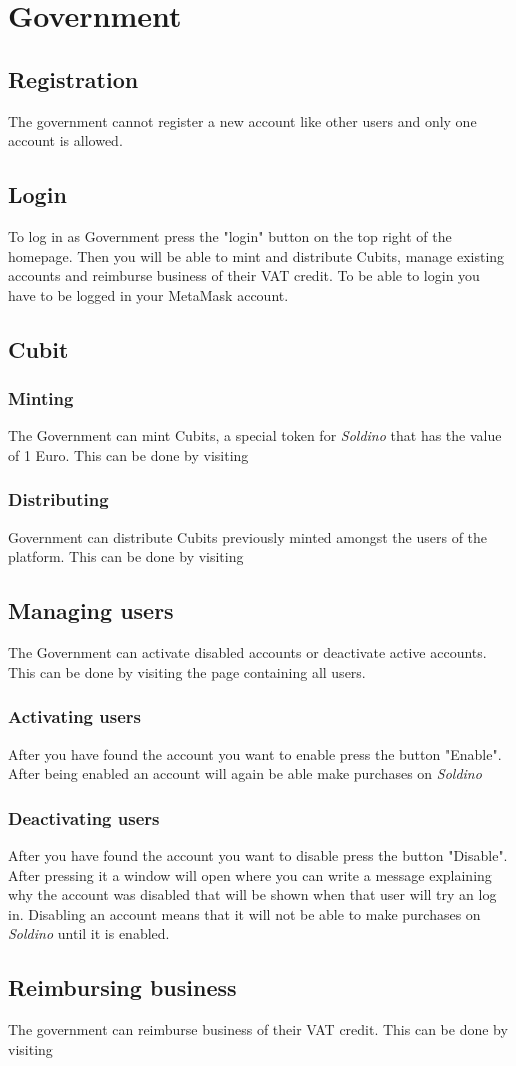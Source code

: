 \section{Government}
	\subsection{Registration}
	The government cannot register a new account like other users and only one 
	account is allowed. 
	\subsection{Login}
	To log in as Government press the "login" button on the top right of the 
	homepage. Then you will be able to mint and distribute Cubits, manage existing accounts and reimburse business of their VAT credit. To be able to login you 
	have to be logged in your MetaMask account.
	\subsection{Cubit}
		\subsubsection{Minting}
		The Government can mint Cubits, a special token for \textit{Soldino} 
		that has the value of 1 Euro. This can be done by visiting 
		\subsubsection{Distributing}
		Government can distribute Cubits previously minted amongst the users of 
		the platform. This can be done by visiting 
	\subsection{Managing users}
	The Government can activate disabled accounts or deactivate active accounts.
	This can be done by visiting the page containing all users.
		\subsubsection{Activating users}
		After you have found the account you want to enable press the button 
		"Enable". After being enabled an account will again be able make purchases
		on \textit{Soldino}
		\subsubsection{Deactivating users}
		After you have found the account you want to disable press the button 
		"Disable". After pressing it a window will open where you can write a
		message explaining why the account was disabled that will be shown 
		when that user will try an log in. Disabling an account means that it will not be able to make purchases on \textit{Soldino}
		until it is enabled.
	\subsection{Reimbursing business}
	The government can reimburse business of their VAT credit. This can be done 
	by visiting %